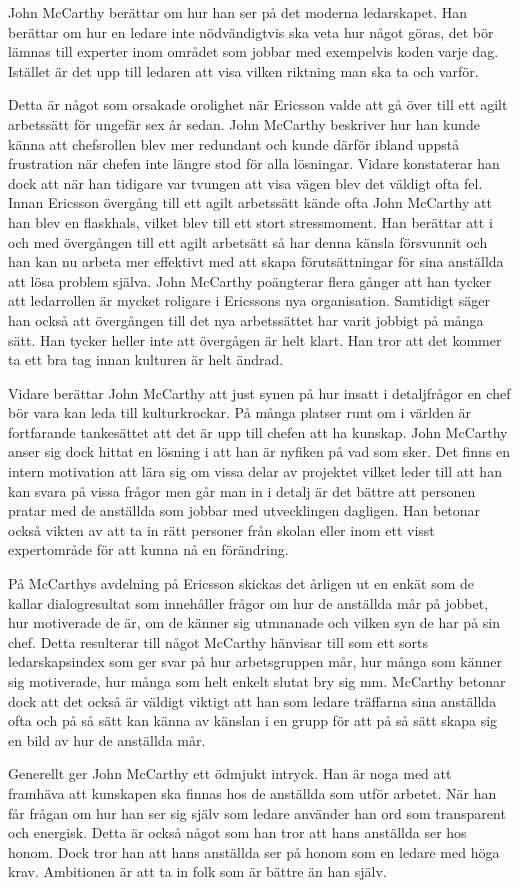 John McCarthy berättar om hur han ser på det moderna ledarskapet. Han berättar om hur en ledare inte nödvändigtvis ska veta hur något göras, det bör lämnas till experter inom området som jobbar med exempelvis koden varje dag. Istället är det upp till ledaren att  visa vilken riktning man ska ta och varför.

Detta är något som orsakade orolighet när Ericsson valde att gå över till ett agilt arbetssätt för ungefär sex år sedan. John McCarthy beskriver hur han kunde känna att chefsrollen blev mer redundant och kunde därför ibland uppstå frustration när chefen inte längre stod för alla lösningar. Vidare konstaterar han dock att när han tidigare var tvungen att visa vägen blev det väldigt ofta fel. Innan Ericsson övergång till ett agilt arbetssätt kände ofta John McCarthy att han blev en flaskhals, vilket blev till ett stort stressmoment. Han berättar att i och med övergången till ett agilt arbetsätt så har denna känsla försvunnit och han kan nu arbeta mer effektivt med att skapa förutsättningar för sina anställda att lösa problem själva. John McCarthy poängterar flera gånger att han tycker att ledarrollen är mycket roligare i Ericssons nya organisation. Samtidigt säger han också att övergången till det nya arbetssättet har varit jobbigt på många sätt. Han tycker heller inte att övergågen är helt klart. Han tror att det kommer ta ett bra tag innan kulturen är helt ändrad.

Vidare berättar John McCarthy att just synen på hur insatt i detaljfrågor en chef bör vara kan leda till kulturkrockar. På många platser runt om i världen är fortfarande tankesättet att det är upp till chefen att ha kunskap. John McCarthy anser sig dock hittat en lösning i att han är nyfiken på vad som sker. Det finns en intern motivation att lära sig om vissa delar av projektet vilket leder till att han kan svara på vissa frågor men går man in i detalj är det bättre att personen pratar med de anställda som jobbar med utvecklingen dagligen. Han betonar också vikten av att ta in rätt personer från skolan eller inom ett visst expertområde för att kunna nå en förändring.

På McCarthys avdelning på Ericsson skickas det årligen ut en enkät som de kallar dialogresultat som innehåller frågor om hur de anställda mår på jobbet, hur motiverade de är, om de känner sig utmnanade och vilken syn de har på sin chef. Detta resulterar till något McCarthy hänvisar till som ett sorts ledarskapsindex som ger svar på hur arbetsgruppen mår, hur många som känner sig motiverade, hur många som helt enkelt slutat bry sig mm. McCarthy betonar dock att det också är väldigt viktigt att han som ledare träffarna sina anställda ofta och på så sätt kan känna av känslan i en grupp för att på så sätt skapa sig en bild av hur de anställda mår.

Generellt ger John McCarthy ett ödmjukt intryck. Han är noga med att framhäva att kunskapen ska finnas hos de anställda som utför arbetet. När han får frågan om hur han ser sig själv som ledare använder han ord som transparent och energisk. Detta är också något som han tror att hans anställda ser hos honom. Dock tror han att hans anställda ser på honom som en ledare med höga krav. Ambitionen är att ta in folk som är bättre än han själv.